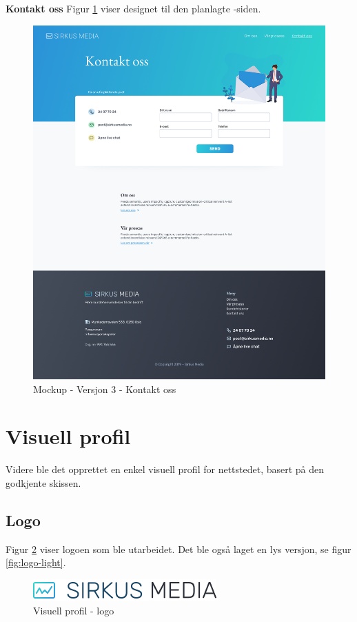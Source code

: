\textbf{Kontakt oss}
Figur \ref{fig:mockup-v3-contact} viser designet til den planlagte -siden.
\begin{figure}[H]
    \centering
    \includegraphics[width=\textwidth]{design/mockup3-contact.png}
    \caption{Mockup - Versjon 3 - Kontakt oss}
    \label{fig:mockup-v3-contact}
\end{figure}

\section{Visuell profil}
Videre ble det opprettet en enkel visuell profil for nettstedet, basert på den godkjente skissen.

\subsection{Logo}
Figur \ref{fig:logo-default} viser logoen som ble utarbeidet. Det ble også laget en lys versjon, se figur \ref{fig:logo-light}.

\begin{figure}[H]
    \centering
    \includegraphics[width=.5\textwidth]{design/logo.png}
    \caption{Visuell profil - logo}
    \label{fig:logo-default}
\end{figure}

